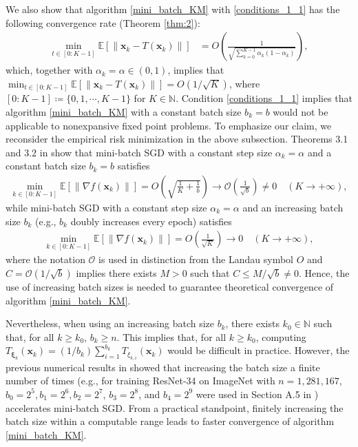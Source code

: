 \documentclass[smallextended,referee,envcountsect,]{svjour3}
\begin{document}
We also show that algorithm \eqref{mini_batch_KM} with \eqref{conditions_1_1} has the following convergence rate (Theorem \ref{thm:2}):
\begin{align*}
\min_{t \in [0:K-1]} \mathbb{E} \left[ \| \bm{x}_k - T (\bm{x}_{k})\| \right]
&= 
O \left( \frac{1}{\sqrt{\sum_{k=0}^{K-1} \alpha_k (1 - \alpha_k)}} \right),
\end{align*}
which, together with $\alpha_k = \alpha \in (0,1)$, implies that $\min_{t \in [0:K-1]} \mathbb{E} [ \| \bm{x}_k - T (\bm{x}_{k})\| ] = O(1/\sqrt{K})$, where $[0:K-1] \coloneqq \{0,1,\cdots, K-1\}$ for $K \in \mathbb{N}$. Condition \eqref{conditions_1_1} implies that algorithm \eqref{mini_batch_KM} with a constant batch size $b_k = b$ would not be applicable to nonexpansive fixed point problems. To emphasize our claim, we reconsider the empirical risk minimization in the above subsection. Theorems 3.1 and 3.2 in \cite{umeda2025increasing} show that mini-batch SGD with a constant step size $\alpha_k = \alpha$ and a constant batch size $b_k = b$ satisfies 
\begin{align*}
\min_{k \in [0:K-1]}\mathbb{E} \left[ \|\nabla f (\bm{x}_k)\| \right] 
= O \left( \sqrt{\frac{1}{K} + \frac{1}{b}}  \right)
\to \mathcal{O} \left(\frac{1}{\sqrt{b}} \right) \neq 0 \quad (K \to + \infty),
\end{align*}
while mini-batch SGD with a constant step size $\alpha_k = \alpha$ and an increasing batch size $b_k$ (e.g., $b_k$ doubly increases every epoch) satisfies 
\begin{align*}
\min_{k \in [0:K-1]}\mathbb{E} \left[ \|\nabla f (\bm{x}_k)\| \right] 
= O \left( \frac{1}{\sqrt{K}}  \right)
\to 0 \quad (K \to + \infty),
\end{align*}
where the notation $\mathcal{O}$ is used in distinction from the Landau symbol $O$ and $C = \mathcal{O}(1/\sqrt{b})$ implies there exists $M > 0$ such that $C \leq M/\sqrt{b} \neq 0$. Hence, the use of increasing batch sizes is needed to guarantee theoretical convergence of algorithm \eqref{mini_batch_KM}.

Nevertheless, when using an increasing batch size $b_k$, there exists $k_0 \in \mathbb{N}$ such that, for all $k \geq k_0$, $b_k \geq n$. This implies that, for all $k \geq k_0$, computing $T_{\bm{\xi}_k} (\bm{x}_k) = (1/b_k) \sum_{i=1}^{b_k} T_{\xi_{k,i}} (\bm{x}_k)$ would be difficult in practice. However, the previous numerical results in \cite{umeda2025increasing} showed that increasing the batch size a finite number of times (e.g., for training ResNet-34 on ImageNet with $n = 1,281,167$, $b_0 = 2^5, b_1 = 2^6, b_2 = 2^7$, $b_3 = 2^8$, and $b_4 = 2^9$ were used in Section A.5 in \cite{umeda2025increasing}) accelerates mini-batch SGD. From a practical standpoint, finitely increasing the batch size within a computable range leads to faster convergence of algorithm \eqref{mini_batch_KM}.
\end{document}
